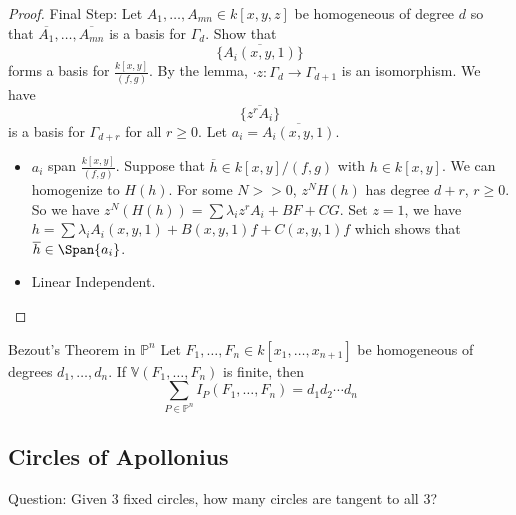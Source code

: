 \documentclass{report}
\begin{document}
\begin{proof}
    Final Step: Let $A_{1}, \ldots, A_{ mn} \in k[ x, y, z]$ be homogeneous of degree $d$ so that $\overline{A_{1}}, \ldots, \overline{ A_{mn}}$ is a basis for $\Gamma_{ d}$. Show that
        \begin{equation*}
            \{\overline{A_{i}(x, y, 1)}\}
        \end{equation*}
    forms a basis for $\frac{k[x, y]}{ (f, g)}$. By the lemma, $\cdot z : \Gamma_{ d} \rightarrow \Gamma_{ d + 1}$ is an isomorphism. We have
        \begin{equation*}
            \{\overline{z^{r}A_{i}}\}
        \end{equation*}
    is a basis for $\Gamma_{d + r}$ for all $r \geq 0$. Let $a_{i} = \overline{A_{i}(x, y, 1)}$. 
        \begin{itemize}
            \item $a_{i}$ span $\frac{k[x, y]}{(f, g)}$. Suppose that $\overline{h} \in k[ x, y]/(f, g)$ with $h \in k[ x, y]$. We can homogenize to $H(h)$. For some $N >>  0$, $z^{N}H(h)$ has degree $d + r$, $r \geq 0$. So we have $z^{N}(H(h)) = \sum \lambda_{ i}z^{r}A_{i} + BF + CG$. Set $z = 1$, we have $h = \sum \lambda_{ i}A_{i}(x, y, 1) + B(x, y, 1)f + C(x, y, 1)f$ which shows that $\overline{h} \in \Span{ a_{i}}$.

            \item Linear Independent.
        \end{itemize}
\end{proof}

\begin{theorem}{Bezout's Theorem in $\mathbb{P}^{n}$}
    Let $F_{1}, \ldots, F_{ n} \in k[ x_{1}, \ldots, x_{ n + 1}]$ be homogeneous of degrees $d_{1}, \ldots, d_{ n}$. If $\mathbb{V}(F_{1}, \ldots, F_{n})$ is finite, then 
        \begin{equation*}
            \sum_{ P \in \mathbb{P}^{n}} I_{P}(F_{1}, \ldots, F_{n}) = d_{1}d_{2} \cdots d_{ n}
        \end{equation*}
\end{theorem}

\begin{topic}
    \section{Circles of Apollonius}
\end{topic}

Question: Given $3$ fixed circles, how many circles are tangent to all $3$?
\end{document}
